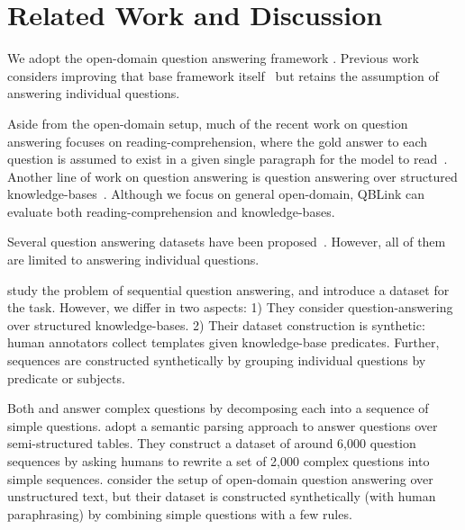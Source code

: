 \section{Related Work and Discussion}

We adopt the open-domain question answering framework
\cite{wang2018evidence,chen2017reading}.  Previous work considers
improving that base framework itself~\cite[inter
alia]{clark2018simple,swayamdipta2017multi} but retains the
assumption of answering individual questions.

Aside from the open-domain setup, much of the recent work on question
answering focuses on reading-comprehension, where the gold answer to
each question is assumed to exist in a given single paragraph for the
model to read~\cite{hermann2015teaching,rajpurkar2016squad,
  seo2017bidirectional}. Another line of work on question answering is
question answering over structured
knowledge-bases~\cite{berant2013semantic,berant2014semantic,yao2014information,gardner2017open}.
Although we focus on general open-domain, QBLink can evaluate both
reading-comprehension and knowledge-bases.



Several question answering datasets have been proposed~\cite[inter
alia]{berant2013semantic,
  joshiTriviaQA2017,trischler2016newsqa,rajpurkar2018know}. However,
all of them are limited to answering individual questions.


 study the problem of sequential question
answering, and introduce a dataset for the task.  However, we differ
in two aspects: 1) They consider question-answering over structured
knowledge-bases.  2) Their dataset construction is synthetic: human
annotators collect templates given knowledge-base predicates. Further,
sequences are constructed synthetically by grouping individual
questions by predicate or subjects.


Both  and  answer complex
questions by decomposing each into a sequence of simple
questions.  adopt a semantic parsing approach to
answer questions over semi-structured tables. They construct a dataset
of around 6,000 question sequences by asking humans to rewrite a set
of 2,000 complex questions into simple sequences.
 consider the setup of open-domain question
answering over unstructured text, but their dataset is constructed
synthetically (with human paraphrasing) by combining simple questions
with a few rules.

